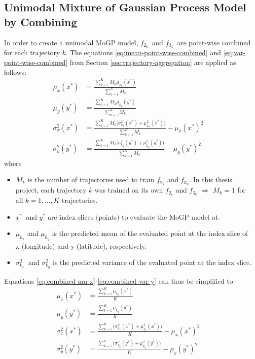 \subsection{Unimodal Mixture of Gaussian Process Model by Combining}
In order to create a unimodal MoGP model, $f_{2_k}$ and $f_{3_k}$ are point-wise combined for each trajectory $k$.
The equations \ref{eq:mean-point-wise-combined} and \ref{eq:var-point-wise-combined} from Section \ref{sec:trajectory-aggregation} are applied as follows:
\begin{align}
    \mu_x(x^*) &= \frac{\sum_{k=1}^{K} M_k\mu_{k_x}(x^*)}{\sum_{k=1}^{K} M_k} \label{eq:combined-mu-x} \\
    \mu_y(y^*) &= \frac{\sum_{k=1}^{K} M_k\mu_{k_y}(y^*)}{\sum_{k=1}^{K} M_k} \label{eq:combined-mu-y} \\
    \sigma_x^2(x^*) &= \frac{\sum_{k=1}^{K} M_k\Big(\sigma_{k_x}^2(x^*) + \mu_{k_x}^2(x^*)\Big)}{\sum_{k=1}^{K} M_k} - \mu_x(x^*)^2 \label{eq:combined-var-x} \\
    \sigma_y^2(y^*) &= \frac{\sum_{k=1}^{K} M_k\Big(\sigma_{k_y}^2(y^*) + \mu_{k_y}^2(y^*)\Big)}{\sum_{k=1}^{K} M_k} - \mu_y(y^*)^2 \label{eq:combined-var-y}
\end{align}
where
\begin{itemize}
    \item $M_k$ is the number of trajectories used to train $f_{2_k}$ and $f_{3_k}$.
    In this thesis project, each trajectory $k$ was trained on its own $f_{2_k}$ and $f_{3_k}$ $\Rightarrow$ $M_k = 1$ for all $k = 1,\dotso,K$ trajectories.
    \item $x^*$ and $y^*$ are index slices (points) to evaluate the MoGP model at.
    \item $\mu_{k_x}$ and $\mu_{k_y}$ is the predicted mean of the evaluated point at the index slice of x (longitude) and y (latitude), respectively. 
    \item $\sigma_{k_x}^2$ and $\sigma_{k_y}^2$ is the predicted variance of the evaluated point at the index slice. 
\end{itemize}

Equations \ref{eq:combined-mu-x}-\ref{eq:combined-var-y} can thus be simplified to
\begin{align}
    \mu_x(x^*) &= \frac{\sum_{k=1}^{K} \mu_{k_x}(x^*)}{K} \label{eq:simplified-combined-mu-x} \\
    \mu_y(y^*) &= \frac{\sum_{k=1}^{K} \mu_{k_y}(y^*)}{K} \label{eq:simplified-combined-mu-y} \\
    \sigma_x^2(x^*) &= \frac{\sum_{k=1}^{K} \Big(\sigma_{k_x}^2(x^*) + \mu_{k_x}^2(x^*)\Big)}{K} - \mu_x(x^*)^2 \label{eq:simplified-combined-var-x} \\
    \sigma_y^2(y^*) &= \frac{\sum_{k=1}^{K} \Big(\sigma_{k_y}^2(y^*) + \mu_{k_y}^2(y^*)\Big)}{K} - \mu_y(y^*)^2 \label{eq:simplified-combined-var-y}
\end{align}

